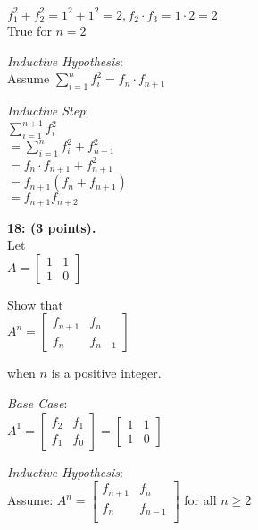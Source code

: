 \documentclass[12pt]{article}  %
\begin{document}
\noindent
$f_1^2+f_2^2=1^2+1^2=2,f_2\cdot f_3=1\cdot2=2$\\
True for $n=2$

\noindent
\textit{Inductive Hypothesis}:\\
Assume $\displaystyle\sum_{i=1}^n f_i^2=f_n\cdot f_{n+1}$

\noindent
\textit{Inductive Step}:\\
$\displaystyle\sum_{i=1}^{n+1} f_i^2$\\
$\displaystyle=\sum_{i=1}^n f_i^2+f_{n+1}^2$\\
$\displaystyle=f_n\cdot f_{n+1}+f_{n+1}^2$\\
$=f_{n+1}(f_n+f_{n+1})$\\
$=f_{n+1}f_{n+2}$

\noindent
{\bf 18: (3 points).}\\

\noindent
Let\\
$A=\begin{bmatrix}
    1 & 1 \\
    1 & 0
\end{bmatrix}$

\noindent
Show that\\
$A^n=\begin{bmatrix}
    f_{n+1} & f_n \\
    f_n     & f_{n-1}
\end{bmatrix}$

\noindent
when $n$ is a positive integer.

\noindent
\textit{Base Case}:\\
$\displaystyle A^1=\begin{bmatrix}
    f_2 & f_1 \\
    f_1 & f_0
\end{bmatrix}=\begin{bmatrix}
    1 & 1 \\
    1 & 0
\end{bmatrix}$

\noindent
\textit{Inductive Hypothesis}:\\
Assume: $\displaystyle A^n=\begin{bmatrix}
    f_{n+1} & f_{n}   \\
    f_{n}   & f_{n-1} \\
\end{bmatrix}$ for all $n\geq2$
\end{document}
